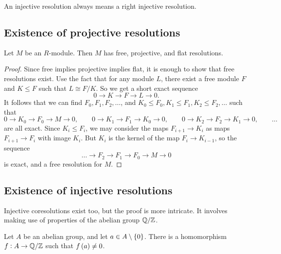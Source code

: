 An injective resolution always means a right injective resolution.

\subsection{Existence of projective resolutions}

\begin{proposition}
Let $ M $ be an $ R $-module. Then $ M $ has free, projective, and flat resolutions.
\end{proposition}

\begin{proof}
Since free implies projective implies flat, it is enough to show that free resolutions exist. Use the fact that for any module $ L $, there exist a free module $ F $ and $ K \le F $ such that $ L \cong F / K $. So we get a short exact sequence
$$ 0 \to K \to F \to L \to 0. $$
It follows that we can find $ F_0, F_1, F_2, \dots $, and $ K_0 \le F_0, K_1 \le F_1, K_2 \le F_2, \dots $ such that
$$ 0 \to K_0 \to F_0 \to M \to 0, \qquad 0 \to K_1 \to F_1 \to K_0 \to 0, \qquad 0 \to K_2 \to F_2 \to K_1 \to 0, \qquad \dots $$
are all exact. Since $ K_i \le F_i $, we may consider the maps $ F_{i + 1} \to K_i $ as maps $ F_{i + 1} \to F_i $ with image $ K_i $. But $ K_i $ is the kernel of the map $ F_i \to K_{i - 1} $, so the sequence
$$ \dots \to F_2 \to F_1 \to F_0 \to M \to 0 $$
is exact, and a free resolution for $ M $.
\end{proof}

\subsection{Existence of injective resolutions}

Injective coresolutions exist too, but the proof is more intricate. It involves making use of properties of the abelian group $ \mathbb{Q} / \mathbb{Z} $.

\begin{proposition}
Let $ A $ be an abelian group, and let $ a \in A \setminus \cbr{0} $. There is a homomorphism $ f : A \to \mathbb{Q} / \mathbb{Z} $ such that $ f\br{a} \ne 0 $. %
\end{proposition}


